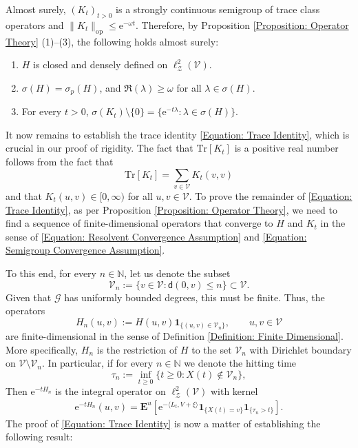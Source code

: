 \documentclass{amsart}
\numberwithin{equation}{section}
\theoremstyle{definition}
\newcommand\la{\lambda}
\newcommand\om{\omega}
\newcommand\si{\sigma}
\newcommand\mbb{\mathbb}
\newcommand\mbf{\mathbf}
\newcommand\mr{\mathrm}
\newcommand\ms{\mathscr}
\newcommand\msf{\mathsf}
\begin{document}
%

Almost surely, $(K_t)_{t>0}$ is a strongly continuous semigroup of trace class operators and $\|K_t\|_{\mr{op}}\leq\mr e^{-\om t}$.
Therefore, by Proposition \ref{Proposition: Operator Theory} (1)--(3), the following holds almost surely:
\begin{enumerate}
\item $H$ is closed and densely defined on $\ell^2_\ms Z(\ms V)$.
\item $\si(H)=\si_p(H)$, and $\Re(\la)\geq\om$ for all $\la\in\si(H)$.
\item For every $t>0$, $\si(K_t)\setminus\{0\}=\{\mr e^{-t\la}:\la\in\si(H)\}$.
\end{enumerate}
It now remains to establish the trace identity \eqref{Equation: Trace Identity}, which is crucial
in our proof of rigidity. The fact that $\mr{Tr}[K_t]$
is a positive real number follows from the fact that
\[\mr{Tr}[K_t]=\sum_{v\in\ms V}K_t(v,v)\]
and that $K_t(u,v)\in[0,\infty)$ for all $u,v\in\ms V$. To prove the remainder of \eqref{Equation: Trace Identity},
as per Proposition \ref{Proposition: Operator Theory}, we need to find a sequence of finite-dimensional
operators that converge to $H$ and $K_t$ in the sense of \eqref{Equation: Resolvent Convergence Assumption}
and \eqref{Equation: Semigroup Convergence Assumption}.

%

To this end, for every $n\in\mbb N$, let us denote the subset
\[\ms V_n:=\{v\in\ms V:\msf d(0,v)\leq n\}\subset\ms V.\]
Given that $\ms G$ has uniformly bounded degrees, this must be finite. Thus,
the operators
\[H_n(u,v):=H(u,v)\mbf 1_{\{(u,v)\in\ms V_n\}},\qquad u,v\in\ms V\]
are finite-dimensional in the sense of Definition \ref{Definition: Finite Dimensional}.
More specifically, $H_n$ is the restriction of $H$ to the set $\ms V_n$
with Dirichlet boundary on $\ms V\setminus\ms V_n$. In particular,
if for every $n\in\mbb N$ we denote the hitting time
\[\tau_n:= \inf_{t\geq0}\big\{t\geq 0: X(t)\not\in\ms V_n\big\},\]
Then $\mr e^{-tH_n}$ is the integral operator on $\ell^2_\ms Z(\ms V)$ with kernel
\begin{align}
\label{Equation: Finite Kernel}
\mr e^{-tH_n}(u,v)=\mbf E^u\left[\mr e^{-\langle L_t,V+\xi\rangle}\mbf 1_{\{X(t)=v\}}\mbf 1_{\{\tau_n>t\}}\right].
\end{align}
The proof of \eqref{Equation: Trace Identity} is now a matter of establishing the following result:

%
\end{document}
